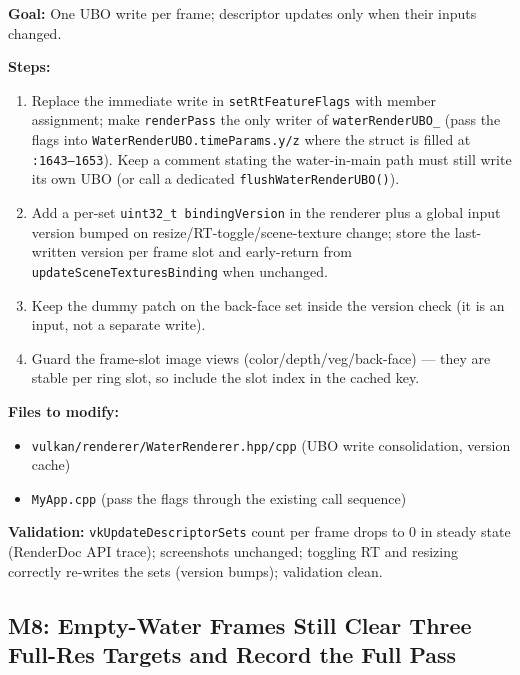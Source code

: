 \documentclass[11pt,a4paper]{article}
\begin{document}
\begin{tcolorbox}[promptbox={Prompt: Single Water UBO Write and Versioned Descriptor Caching}]
\textbf{Goal:} One UBO write per frame; descriptor updates only when their inputs changed.

\textbf{Steps:}
\begin{enumerate}
    \item Replace the immediate write in \texttt{setRtFeatureFlags} with member assignment; make \texttt{renderPass} the only writer of \texttt{waterRenderUBO\_} (pass the flags
    into \texttt{WaterRenderUBO.timeParams.y/z} where the struct is filled at \texttt{:1643--1653}). Keep a comment stating the water-in-main path must still write its own UBO
    (or call a dedicated \texttt{flushWaterRenderUBO()}).
    \item Add a per-set \texttt{uint32\_t bindingVersion} in the renderer plus a global input version bumped on resize/RT-toggle/scene-texture change; store the last-written
    version per frame slot and early-return from \texttt{updateSceneTexturesBinding} when unchanged.
    \item Keep the dummy patch on the back-face set inside the version check (it is an input, not a separate write).
    \item Guard the frame-slot image views (color/depth/veg/back-face) --- they are stable per ring slot, so include the slot index in the cached key.
\end{enumerate}

\textbf{Files to modify:}
\begin{itemize}
    \item \texttt{vulkan/renderer/WaterRenderer.hpp/cpp} (UBO write consolidation, version cache)
    \item \texttt{MyApp.cpp} (pass the flags through the existing call sequence)
\end{itemize}

\textbf{Validation:} \texttt{vkUpdateDescriptorSets} count per frame drops to 0 in steady state (RenderDoc API trace); screenshots unchanged; toggling RT and resizing
correctly re-writes the sets (version bumps); validation clean.
\end{tcolorbox}

\subsection{M8: Empty-Water Frames Still Clear Three Full-Res Targets and Record the Full Pass}
\end{document}
